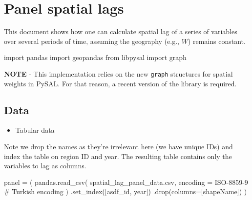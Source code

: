 \documentclass[
  letterpaper,
  DIV=11,
  numbers=noendperiod]{scrreprt}
\newenvironment{Shaded}{\begin{snugshade}}{\end{snugshade}}
\newcommand{\CommentTok}[1]{\textcolor[rgb]{0.37,0.37,0.37}{#1}}
\newcommand{\ImportTok}[1]{\textcolor[rgb]{0.00,0.46,0.62}{#1}}
\newcommand{\NormalTok}[1]{\textcolor[rgb]{0.00,0.23,0.31}{#1}}
\newcommand{\OperatorTok}[1]{\textcolor[rgb]{0.37,0.37,0.37}{#1}}
\newcommand{\StringTok}[1]{\textcolor[rgb]{0.13,0.47,0.30}{#1}}
\providecommand{\tightlist}{%
  \setlength{\itemsep}{0pt}\setlength{\parskip}{0pt}}\usepackage{longtable,booktabs,array}
\begin{document}

\chapter{Panel spatial lags}\label{panel-spatial-lags}

This document shows how one can calculate spatial lag of a series of
variables over several periods of time, assuming the geography (e.g.,
\(W\)) remains constant.

\begin{Shaded}
\begin{Highlighting}[]
\ImportTok{import}\NormalTok{ pandas}
\ImportTok{import}\NormalTok{ geopandas}
\ImportTok{from}\NormalTok{ libpysal }\ImportTok{import}\NormalTok{ graph}
\end{Highlighting}
\end{Shaded}

\textbf{NOTE} - This implementation relies on the new \texttt{graph}
structures for spatial weights in PySAL. For that reason, a recent
version of the library is required.

\section{Data}\label{data}

\begin{itemize}
\tightlist
\item
  Tabular data
\end{itemize}

Note we drop the names as they're irrelevant here (we have unique IDs)
and index the table on region ID and year. The resulting table contains
only the variables to lag as columns.

\begin{Shaded}
\begin{Highlighting}[]
\NormalTok{panel }\OperatorTok{=}\NormalTok{ (}
\NormalTok{    pandas.read\_csv(}
        \StringTok{\textquotesingle{}spatial\_lag\_panel\_data.csv\textquotesingle{}}\NormalTok{, }
\NormalTok{        encoding }\OperatorTok{=} \StringTok{\textquotesingle{}ISO{-}8859{-}9\textquotesingle{}} \CommentTok{\# Turkish encoding}
\NormalTok{    )}
\NormalTok{    .set\_index([}\StringTok{\textquotesingle{}asdf\_id\textquotesingle{}}\NormalTok{, }\StringTok{\textquotesingle{}year\textquotesingle{}}\NormalTok{])}
\NormalTok{    .drop(columns}\OperatorTok{=}\NormalTok{[}\StringTok{\textquotesingle{}shapeName\textquotesingle{}}\NormalTok{])}
\NormalTok{)}
\end{Highlighting}
\end{Shaded}
\end{document}
